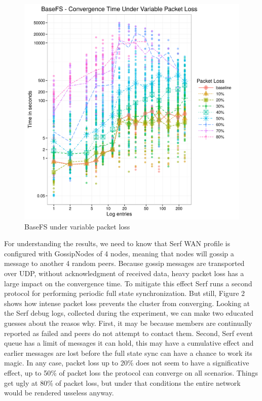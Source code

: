 \documentclass{sig-alternate}
\begin{document}
\begin{figure}[htp]
\centering
\includegraphics[width=\columnwidth]{../eval/plots/basefs-loss.png}
\caption{BaseFS under variable packet loss}
\label{fig:basefs-loss}
\end{figure}

For understanding the results, we need to know that Serf WAN profile is configured with GossipNodes of 4 nodes, meaning that nodes will gossip a message to another 4 random peers. Because gossip messages are transported over UDP, without acknowledgment of received data, heavy packet loss has a large impact on the convergence time. To mitigate this effect Serf runs a second protocol for performing periodic full state synchronization. But still, Figure 2 shows how intense packet loss prevents the cluster from converging. Looking at the Serf debug logs, collected during the experiment, we can make two educated guesses about the reasos why. First, it may be because members are continually reported as failed and peers do not attempt to contact them. Second, Serf event queue has a limit of messages it can hold, this may have a cumulative effect and earlier messages are lost before the full state sync can have a chance to work its magic. In any case, packet loss up to 20\% does not seem to have a significative effect, up to 50\% of packet loss the protocol can converge on all scenarios. Things get ugly at 80\% of packet loss, but under that conditions the entire network would be rendered usseless anyway.
\end{document}
